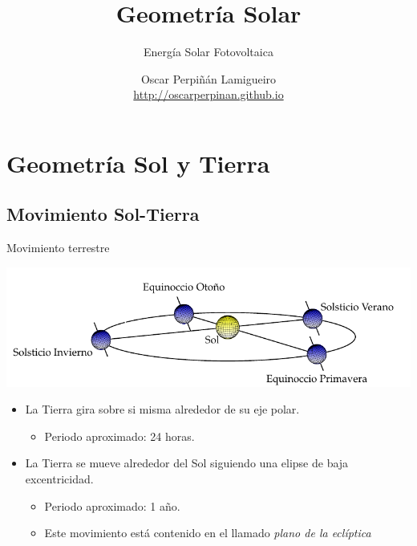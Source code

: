 \documentclass[xcolor={usenames,svgnames,dvipsnames}]{beamer}
\author{Oscar Perpiñán Lamigueiro \\ \url{http://oscarperpinan.github.io}}
\date{}
\title{Geometría Solar}
\subtitle{Energía Solar Fotovoltaica}
\begin{document}
\maketitle

\section{Geometría Sol y Tierra}
\label{sec:org0bb1b27}
\subsection{Movimiento Sol-Tierra}
\label{sec:orgbe7a472}

\begin{frame}[label={sec:org415b95b}]{Movimiento terrestre}
\begin{center}
\includegraphics[width=.9\linewidth]{../figs/PlanoEcliptica.pdf}
\end{center}

\begin{itemize}[<+->]
\item La Tierra \alert{gira sobre si misma} alrededor de su eje polar.
\begin{itemize}[<.->]
\item Periodo aproximado: 24 horas.
\end{itemize}

\item La Tierra se mueve \alert{alrededor del Sol} siguiendo una elipse de baja
excentricidad.
\begin{itemize}[<.->]
\item Periodo aproximado: 1 año.

\item Este movimiento está contenido en el llamado \emph{plano de la
eclíptica}
\end{itemize}
\end{itemize}
\end{frame}
\end{document}

